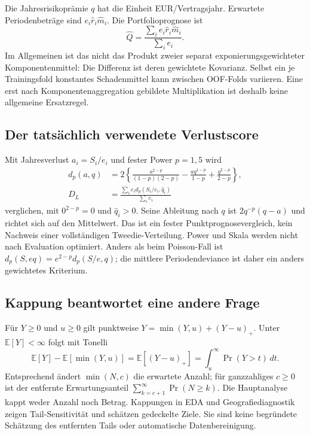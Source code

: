\documentclass[11pt,a4paper]{article}
\newcommand{\E}{\mathbb E}
\begin{document}
Die Jahresrisikoprämie $q$ hat die Einheit EUR/Vertragsjahr. Erwartete Periodenbeträge sind $e_i\widehat r_i\widehat m_i$. Die Portfolioprognose ist
\begin{equation}
 \widehat Q=\frac{\sum_i e_i\widehat r_i\widehat m_i}{\sum_i e_i}.
\end{equation}
Im Allgemeinen ist das nicht das Produkt zweier separat exponierungsgewichteter Komponentenmittel: Die Differenz ist deren gewichtete Kovarianz. Selbst ein je Trainingsfold konstantes Schadenmittel kann zwischen OOF-Folds variieren. Eine erst nach Komponentenaggregation gebildete Multiplikation ist deshalb keine allgemeine Ersatzregel.

\subsection*{Der tatsächlich verwendete Verlustscore}
Mit Jahresverlust $a_i=S_i/e_i$ und fester Power $p=1{,}5$ wird
\begin{align}
 d_p(a,q)&=2\left\{\frac{a^{2-p}}{(1-p)(2-p)}
             -\frac{a q^{1-p}}{1-p}+\frac{q^{2-p}}{2-p}\right\},\\
 D_L&=\frac{\sum_i e_i d_p(S_i/e_i,\widehat q_i)}{\sum_i e_i}
\end{align}
verglichen, mit $0^{2-p}=0$ und $\widehat q_i>0$. Seine Ableitung nach $q$ ist $2q^{-p}(q-a)$ und richtet sich auf den Mittelwert. Das ist ein fester Punktprognosevergleich, kein Nachweis einer vollständigen Tweedie-Verteilung. Power und Skala werden nicht nach Evaluation optimiert. Anders als beim Poisson-Fall ist $d_p(S,eq)=e^{2-p}d_p(S/e,q)$; die mittlere Periodendeviance ist daher ein anders gewichtetes Kriterium.

\subsection*{Kappung beantwortet eine andere Frage}
Für $Y\geq0$ und $u\geq0$ gilt punktweise $Y=\min(Y,u)+(Y-u)_+$. Unter $\E[Y]<\infty$ folgt mit Tonelli
\begin{equation}
 \E[Y]-\E[\min(Y,u)]=\E[(Y-u)_+]=\int_u^\infty\Pr(Y>t)\,dt.
\end{equation}
Entsprechend ändert $\min(N,c)$ die erwartete Anzahl; für ganzzahliges $c\geq0$ ist der entfernte Erwartungsanteil $\sum_{k=c+1}^\infty\Pr(N\geq k)$. Die Hauptanalyse kappt weder Anzahl noch Betrag. Kappungen in EDA und Geografiediagnostik zeigen Tail-Sensitivität und schätzen gedeckelte Ziele. Sie sind keine begründete Schätzung des entfernten Tails oder automatische Datenbereinigung.
\end{document}
